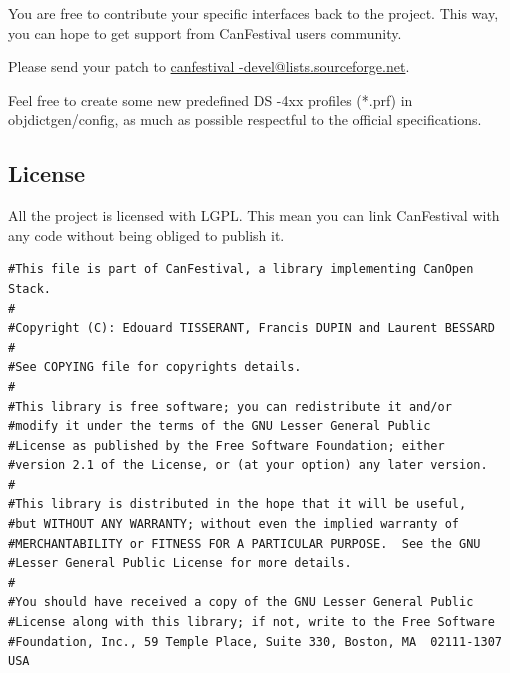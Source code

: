\documentclass[12pt,english,a4paper]{book}
\begin{document}
You are free to contribute your specific interfaces back to the project.
This way, you can hope to get support from CanFestival users community.

Please send your patch to \href{mailto:canfestival-devel@lists.sourceforge.net}{canfestival
-devel@lists.sourceforge.net}.

Feel free to create some new predefined DS -4xx profiles ({*}.prf)
in objdictgen/config, as much as possible respectful to the official
specifications.


\subsection{License}

All the project is licensed with LGPL. This mean you can link CanFestival
with any code without being obliged to publish it.


\begin{verbatim}
#This file is part of CanFestival, a library implementing CanOpen Stack. 
# 
#Copyright (C): Edouard TISSERANT, Francis DUPIN and Laurent BESSARD 
# 
#See COPYING file for copyrights details. 
# 
#This library is free software; you can redistribute it and/or 
#modify it under the terms of the GNU Lesser General Public 
#License as published by the Free Software Foundation; either 
#version 2.1 of the License, or (at your option) any later version. 
# 
#This library is distributed in the hope that it will be useful, 
#but WITHOUT ANY WARRANTY; without even the implied warranty of 
#MERCHANTABILITY or FITNESS FOR A PARTICULAR PURPOSE.  See the GNU 
#Lesser General Public License for more details. 
# 
#You should have received a copy of the GNU Lesser General Public 
#License along with this library; if not, write to the Free Software 
#Foundation, Inc., 59 Temple Place, Suite 330, Boston, MA  02111-1307  USA 
\end{verbatim}
\end{document}
